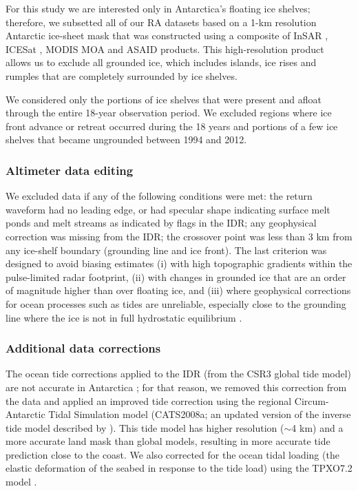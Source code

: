For this study we are interested only in Antarctica's floating ice shelves; therefore, we subsetted all of our RA datasets based on a 1-km resolution Antarctic ice-sheet mask \parencite{Depoorter2013} that was constructed using a composite of InSAR \parencite{Rignot2011}, ICESat \parencite{Brunt2010, Fricker2009}, MODIS MOA \parencite{Scambos2007} and ASAID \parencite{Bindschadler2011} products. This high-resolution product allows us to exclude all grounded ice, which includes islands, ice rises and rumples that are completely surrounded by ice shelves.

We considered only the portions of ice shelves that were present and afloat through the entire 18-year observation period. We excluded regions where ice front advance or retreat occurred during the 18 years and portions of a few ice shelves that became ungrounded between 1994 and 2012.

\subsubsection{Altimeter data editing}

We excluded data if any of the following conditions were met: the return waveform had no leading edge, or had specular shape indicating surface melt ponds and melt streams \parencite{Phillips1998} as indicated by flags in the IDR; any geophysical correction was missing from the IDR; the crossover point was less than 3 km from any ice-shelf boundary (grounding line and ice front). The last criterion was designed to avoid biasing estimates (i) with high topographic gradients within the pulse-limited radar footprint, (ii) with changes in grounded ice that are an order of magnitude higher than over floating ice, and (iii) where geophysical corrections for ocean processes such as tides are unreliable, especially close to the grounding line where the ice is not in full hydrostatic equilibrium \parencite{Fricker2006}.


\subsubsection{Additional data corrections}

The ocean tide corrections applied to the IDR (from the CSR3 global tide model) are not accurate in Antarctica \parencite{King2005}; for that reason, we removed this correction from the data and applied an improved tide correction using the regional Circum-Antarctic Tidal Simulation model (CATS2008a; an updated version of the inverse tide model described by \textcite{Padman2002}). This tide model has higher resolution ($\sim$4 km) and a more accurate land mask than global models, resulting in more accurate tide prediction close to the coast. We also corrected for the ocean tidal loading (the elastic deformation of the seabed in response to the tide load) using the TPXO7.2 model \parencite{Egbert2002}.

